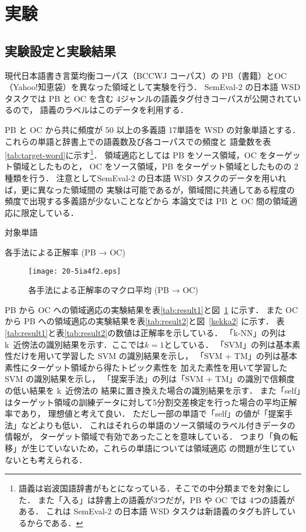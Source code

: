 \documentclass[japanese]{jnlp_1.4}
\begin{document}
\section{実験}

\subsection{実験設定と実験結果}

現代日本語書き言葉均衡コーパス（BCCWJ コーパス）\cite{bccwj}の
PB（書籍）とOC（Yahoo!知恵袋）を異なった領域として実験を行う．
SemEval-2 の日本語 WSD タスク\cite{semeval-2010}では
PB と OC を含む 4ジャンルの語義タグ付きコーパスが公開されているので，
語義のラベルはこのデータを利用する．

PB と OC から共に頻度が 50 以上の多義語 17単語を WSD の対象単語とする．
これらの単語と辞書上での語義数及び各コーパスでの頻度と
語彙数を\mbox{表\ref{tab:target-word}}に示す\footnote{語義は岩波国語辞書がもとになっている．そこでの中分類までを対象にした．
また「入る」は辞書上の語義が3つだが，PB や OC では 4つの語義がある．
これは SemEval-2 の日本語 WSD タスクは新語義のタグも許しているからである．}．
領域適応としては PB をソース領域，OC をターゲット領域としたものと，
OC をソース領域，PB をターゲット領域としたものの 2種類を行う．
注意としてSemEval-2 の日本語 WSD タスクのデータを用いれば，更に異なった領域間の
実験は可能であるが，領域間に共通してある程度の頻度で出現する多義語が少ないことなどから
本論文では PB と OC 間の領域適応に限定している．

\begin{table}[b]
\caption{対象単語}
\label{tab:target-word}

\end{table}

\begin{table}[t]
\caption{各手法による正解率 (PB → OC)}
\label{tab:result1}

\end{table}
\begin{figure}[t]
\begin{center}
\texttt{[image: 20-5ia4f2.eps]}
\end{center}
\caption{各手法による正解率のマクロ平均 (PB → OC)}
\label{kekka1}
\end{figure} 

PB から OC への領域適応の実験結果を\mbox{表\ref{tab:result1}}と図~\ref{kekka1} に示す．
また OC から PB への領域適応の実験結果を\mbox{表\ref{tab:result2}}と図~\ref{kekka2} に示す．
\mbox{表\ref{tab:result1}}と\mbox{表\ref{tab:result2}}の数値は正解率を示している．
「k-NN」の列は k~近傍法の識別結果を示す．ここでは\( k=1 \)としている．
「SVM」の列は基本素性だけを用いて学習した SVM の識別結果を示し，
「SVM + TM」の列は基本素性にターゲット領域から得たトピック素性を
加えた素性を用いて学習した SVM の識別結果を示し，
「提案手法」の列は「SVM + TM」の識別で信頼度の低い結果を k~近傍法の
結果に置き換えた場合の識別結果を示す．
また「self」はターゲット領域の訓練データに対して5分割交差検定を行った場合の平均正解率であり，
理想値と考えて良い．
ただし一部の単語で「self」の値が「提案手法」などよりも低い．
これはそれらの単語のソース領域のラベル付きデータの情報が，
ターゲット領域で有効であったことを意味している．
つまり「負の転移」が生じていないため，これらの単語については領域適応
の問題が生じていないとも考えられる．
\end{document}
